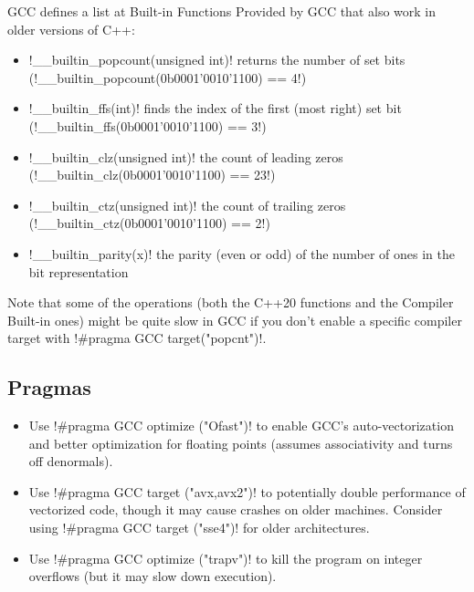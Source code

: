 GCC defines a list at Built-in Functions Provided by GCC that also work in
older versions of C++:
\begin{itemize}
      \item \inlinecode!__builtin_popcount(unsigned int)! returns the number of set bits (\inlinecode!__builtin_popcount(0b0001'0010'1100) == 4!)
      \item \inlinecode!__builtin_ffs(int)! finds the index of the first (most right) set bit (\inlinecode!__builtin_ffs(0b0001'0010'1100) == 3!)
      \item \inlinecode!__builtin_clz(unsigned int)! the count of leading zeros (\inlinecode!__builtin_clz(0b0001'0010'1100) == 23!)
      \item \inlinecode!__builtin_ctz(unsigned int)! the count of trailing zeros (\inlinecode!__builtin_ctz(0b0001'0010'1100) == 2!)
      \item \inlinecode!__builtin_parity(x)! the parity (even or odd) of the number of ones in the bit representation
\end{itemize}

Note that some of the operations (both the C++20 functions and the Compiler
Built-in ones) might be quite slow in GCC if you don't enable a specific
compiler target with \inlinecode!#pragma GCC target("popcnt")!.

\subsection{Pragmas}
\begin{itemize}
      \item Use \inlinecode!#pragma GCC optimize ("Ofast")! to enable GCC's
            auto-vectorization and better optimization for floating points (assumes
            associativity and turns off denormals).
      \item Use \inlinecode!#pragma GCC target ("avx,avx2")! to potentially double
            performance of vectorized code, though it may cause crashes on older machines.
            Consider using \inlinecode!#pragma GCC target ("sse4")! for older
            architectures.
      \item Use \inlinecode!#pragma GCC optimize ("trapv")! to kill the program on integer
            overflows (but it may slow down execution).
\end{itemize}